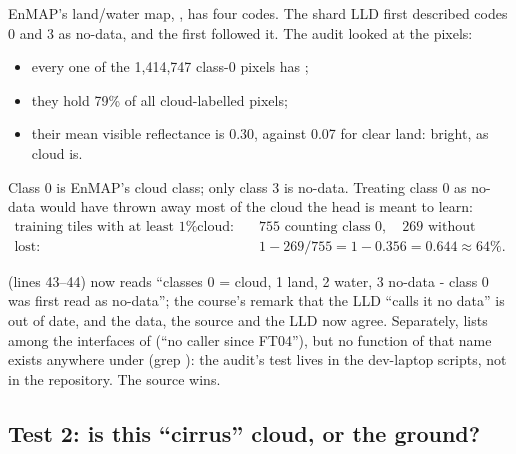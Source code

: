 EnMAP's land/water map, , has four codes. The shard LLD first described codes 0 and 3 as no-data, and the first
 followed it. The audit looked at the pixels:
\begin{itemize}
  \item every one of the 1,414,747 class-0 pixels has ;
  \item they hold 79\% of all cloud-labelled pixels;
  \item their mean visible reflectance is 0.30, against 0.07 for clear land: bright, as cloud is.
\end{itemize}
Class 0 is EnMAP's cloud class; only class 3 is no-data. Treating class 0 as no-data would have thrown away most of the cloud the head is meant to
learn:
\begin{align*}
  \text{training tiles with at least 1\% cloud:}&\quad 755 \text{ counting class 0}, \quad 269 \text{ without}\\
  \text{lost:}&\quad 1 - 269/755 = 1 - 0.356 = 0.644 \approx 64\%.
\end{align*}

\begin{sourcenote}
 (lines 43--44) now reads ``classes 0 = cloud, 1 land, 2 water, 3 no-data - class 0 was first read as no-data''; the
course's remark that the LLD ``calls it no data'' is out of date, and the data, the source and the LLD now agree. Separately,
 lists  among the interfaces of  (``no caller since
FT04''), but no function of that name exists anywhere under  (grep ): the audit's test lives in the dev-laptop
scripts, not in the repository. The source wins.
\end{sourcenote}

\subsection{Test 2: is this ``cirrus'' cloud, or the ground?}

